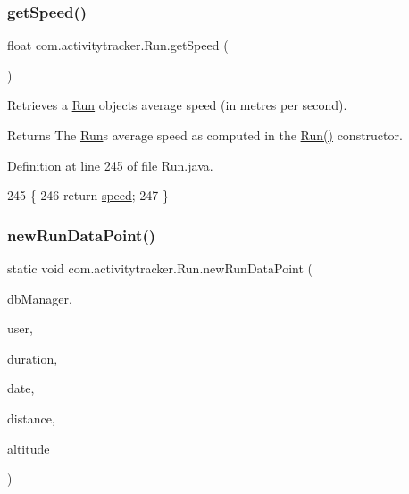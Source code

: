 \subsubsection{\texorpdfstring{get\+Speed()}{getSpeed()}}
{\footnotesize\ttfamily float com.\+activitytracker.\+Run.\+get\+Speed (\begin{DoxyParamCaption}{ }\end{DoxyParamCaption})}

Retrieves a \mbox{\hyperlink{classcom_1_1activitytracker_1_1_run}{Run}} object\textquotesingle{}s average speed (in metres per second).

\begin{DoxyReturn}{Returns}
The \mbox{\hyperlink{classcom_1_1activitytracker_1_1_run}{Run}}\textquotesingle{}s average speed as computed in the \mbox{\hyperlink{classcom_1_1activitytracker_1_1_run_a5568c1c514835056d2abc22cfba222c5}{Run()}} constructor. 
\end{DoxyReturn}


Definition at line 245 of file Run.\+java.


\begin{DoxyCode}
245                             \{
246         \textcolor{keywordflow}{return} \mbox{\hyperlink{classcom_1_1activitytracker_1_1_run_ada0c6e189d55997133cde5bbe9913984}{speed}};
247     \}
\end{DoxyCode}
\mbox{\label{classcom_1_1activitytracker_1_1_run_a5dea6f1860431103d553ce770382afe0}} 
\subsubsection{\texorpdfstring{new\+Run\+Data\+Point()}{newRunDataPoint()}}
{\footnotesize\ttfamily static void com.\+activitytracker.\+Run.\+new\+Run\+Data\+Point (\begin{DoxyParamCaption}\item[{final \mbox{\hyperlink{classcom_1_1activitytracker_1_1_d_b_manager}{D\+B\+Manager}}}]{db\+Manager,  }\item[{final \mbox{\hyperlink{classcom_1_1activitytracker_1_1_user}{User}}}]{user,  }\item[{final float}]{duration,  }\item[{final Date}]{date,  }\item[{final float}]{distance,  }\item[{final float}]{altitude }\end{DoxyParamCaption})\hspace{0.3cm}{\ttfamily [static]}}

